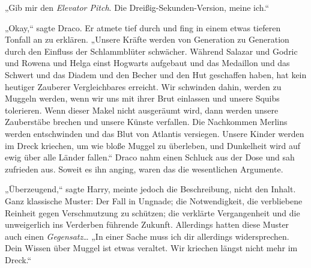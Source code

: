 „Gib mir den \emph{Elevator Pitch}. Die Dreißig-Sekunden-Version, meine ich.“

„Okay,“ sagte Draco. Er atmete tief durch und fing in einem etwas tieferen Tonfall an zu erklären. „Unsere Kräfte werden von Generation zu Generation durch den Einfluss der Schlammblüter schwächer. Während Salazar und Godric und Rowena und Helga einst Hogwarts aufgebaut und das Medaillon und das Schwert und das Diadem und den Becher und den Hut geschaffen haben, hat kein heutiger Zauberer Vergleichbares erreicht. Wir schwinden dahin, werden zu Muggeln werden, wenn wir uns mit ihrer Brut einlassen und unsere Squibs tolerieren. Wenn dieser Makel nicht ausgeräumt wird, dann werden unsere Zauberstäbe brechen und unsere Künste verfallen. Die Nachkommen Merlins werden entschwinden und das Blut von Atlantis versiegen. Unsere Kinder werden im Dreck kriechen, um wie bloße Muggel zu überleben, und Dunkelheit wird auf ewig über alle Länder fallen.“ Draco nahm einen Schluck aus der Dose und sah zufrieden aus. Soweit es ihn anging, waren das die wesentlichen Argumente.

„Überzeugend,“ sagte Harry, meinte jedoch die Beschreibung, nicht den Inhalt. Ganz klassische Muster: Der Fall in Ungnade; die Notwendigkeit, die verbliebene Reinheit gegen Verschmutzung zu schützen; die verklärte Vergangenheit und die unweigerlich ins Verderben führende Zukunft. Allerdings hatten diese Muster auch einen \emph{Gegensatz}… „In einer Sache muss ich dir allerdings widersprechen. Dein Wissen über Muggel ist etwas veraltet. Wir kriechen längst nicht mehr im Dreck.“

